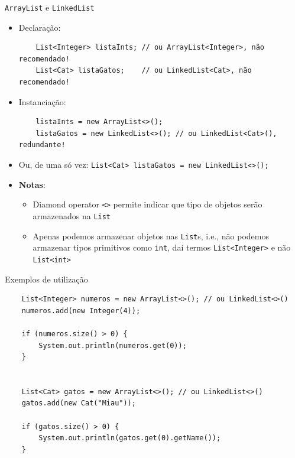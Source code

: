 \documentclass[portuguese, aspectratio=169, xcolor=table]{beamer}
\begin{document}
\begin{frame}[fragile]{\texttt{ArrayList} e \texttt{LinkedList}}
\begin{itemize}
    \item Declaração:
    \begin{verbatim}
    List<Integer> listaInts; // ou ArrayList<Integer>, não recomendado!
    List<Cat> listaGatos;    // ou LinkedList<Cat>, não recomendado!
    \end{verbatim}
    \item Instanciação:
    \begin{verbatim}
    listaInts = new ArrayList<>();
    listaGatos = new LinkedList<>(); // ou LinkedList<Cat>(), redundante! 
    \end{verbatim}
\item Ou, de uma só vez: \texttt{List<Cat> listaGatos = new LinkedList<>();}
\item \textbf{Notas}:
\begin{itemize}
    \item Diamond operator \texttt{<>} permite indicar que tipo de objetos serão armazenados na \texttt{List}
    \item Apenas podemos armazenar objetos nas \texttt{List}s, i.e., não podemos armazenar tipos primitivos como \texttt{int}, daí termos \texttt{List<Integer>} e não \texttt{List<int>}
\end{itemize}
\end{itemize}
\end{frame}

\begin{frame}[fragile]{Exemplos de utilização}
\begin{verbatim}
    List<Integer> numeros = new ArrayList<>(); // ou LinkedList<>()
    numeros.add(new Integer(4));
    
    if (numeros.size() > 0) {
        System.out.println(numeros.get(0));
    }


    List<Cat> gatos = new ArrayList<>(); // ou LinkedList<>()    
    gatos.add(new Cat("Miau"));
    
    if (gatos.size() > 0) {
        System.out.println(gatos.get(0).getName());
    }
\end{verbatim}
\end{frame}
\end{document}
